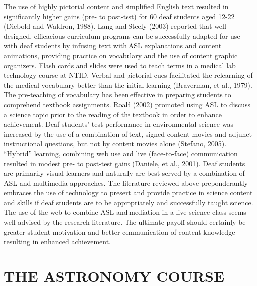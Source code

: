 \documentclass[11.5pt]{sig-alternate} %
\begin{document}
\begin{large}
The use of highly pictorial content and simplified English text resulted in significantly higher gains (pre- to post-test) for 60 deaf students aged 12-22 (Diebold and Waldron, 1988). Lang and Steely (2003) reported that well designed, efficacious curriculum programs can be successfully adapted for use with deaf students by infusing text with ASL explanations and content animations, providing practice on vocabulary and the use of content graphic organizers. Flash cards and slides were used to teach terms in a medical lab technology course at NTID. Verbal and pictorial cues facilitated the relearning of the medical vocabulary better than the initial learning (Braverman, et al., 1979). The pre-teaching of vocabulary has been effective in preparing students to comprehend textbook assignments. Roald (2002) promoted using ASL to discuss a science topic prior to the reading of the textbook in order to enhance achievement. Deaf students’ test performance in environmental science was increased by the use of a combination of text, signed content movies and adjunct instructional questions, but not by content movies alone (Stefano, 2005). “Hybrid” learning, combining web use and live (face-to-face) communication resulted in modest pre- to post-test gains (Daniele, et al., 2001). Deaf students are primarily visual learners and naturally are best served by a combination of ASL and multimedia approaches. The literature reviewed above preponderantly embraces the use of technology to present and provide practice in science content and skills if deaf students are to be appropriately and successfully taught science. The use of the web to combine ASL and mediation in a live science class seems well advised by the research literature. The ultimate payoff should certainly be greater student motivation and better communication of content knowledge resulting in enhanced achievement.


\section*{THE ASTRONOMY COURSE }
 

\end{large}
\end{document}
